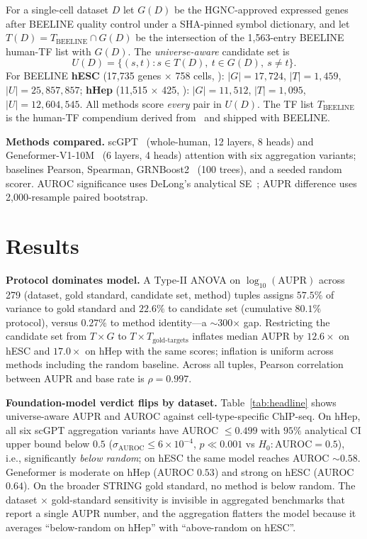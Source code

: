 \documentclass[sigconf, nonacm]{acmart}
\begin{document}
For a single-cell dataset $D$ let $G(D)$ be the HGNC-approved expressed
genes after BEELINE quality control under a SHA-pinned symbol
dictionary, and let $T(D) = T_{\text{BEELINE}} \cap G(D)$ be the
intersection of the 1{,}563-entry BEELINE human-TF list with $G(D)$.
The \emph{universe-aware} candidate set is
\[
U(D) = \{ (s,t) : s \in T(D),\ t \in G(D),\ s \neq t \}.
\]
For BEELINE \textbf{hESC} (17{,}735 genes $\times$ 758 cells,
\cite{chu2016hesc}): $|G|{=}17{,}724$, $|T|{=}1{,}459$,
$|U|{=}25{,}857{,}857$; \textbf{hHep} (11{,}515 $\times$ 425,
\cite{camp2017hhep}): $|G|{=}11{,}512$, $|T|{=}1{,}095$,
$|U|{=}12{,}604{,}545$. All methods score \emph{every} pair in $U(D)$.
The TF list $T_{\text{BEELINE}}$ is the human-TF compendium derived
from~\cite{lambert2018tfs} and shipped with BEELINE.

\textbf{Methods compared.} scGPT~\cite{cui2024scgpt} (whole-human, 12
layers, 8 heads) and Geneformer-V1-10M~\cite{theodoris2023geneformer}
(6 layers, 4 heads) attention with six aggregation variants;
baselines Pearson, Spearman,
GRNBoost2~\cite{moerman2019grnboost2,huynh2010genie3} (100 trees), and
a seeded random scorer. AUROC significance uses DeLong's analytical
SE~\cite{delong1988}; AUPR difference uses 2{,}000-resample paired
bootstrap.

\section{Results}

\textbf{Protocol dominates model.}
A Type-II ANOVA on $\log_{10}(\text{AUPR})$ across 279
(dataset, gold standard, candidate set, method) tuples assigns
$57.5\%$ of variance to gold standard and $22.6\%$ to candidate set
(cumulative $80.1\%$ protocol), versus $0.27\%$ to method identity---a
$\sim$300$\times$ gap. Restricting the candidate set from $T \times G$
to $T \times T_{\text{gold-targets}}$ inflates median AUPR by
$12.6\times$ on hESC and $17.0\times$ on hHep with the same scores;
inflation is uniform across methods including the random baseline.
Across all tuples, Pearson correlation between AUPR and base rate is
$\rho = 0.997$.

\textbf{Foundation-model verdict flips by dataset.}
Table~\ref{tab:headline} shows universe-aware AUPR and AUROC against
cell-type-specific ChIP-seq. On hHep, all six scGPT aggregation
variants have AUROC $\le 0.499$ with $95\%$ analytical CI
upper bound below $0.5$ ($\sigma_{\text{AUROC}} \le 6\!\times\!10^{-4}$,
$p \ll 0.001$ vs $H_0: \text{AUROC}=0.5$), i.e., significantly
\emph{below random}; on hESC the same model reaches AUROC $\sim 0.58$.
Geneformer is moderate on hHep (AUROC $0.53$) and strong on hESC
(AUROC $0.64$). On the broader STRING gold standard, no method is
below random. The dataset $\times$ gold-standard sensitivity is
invisible in aggregated benchmarks that report a single AUPR number,
and the aggregation flatters the model because it averages
``below-random on hHep'' with ``above-random on hESC''.
\end{document}
